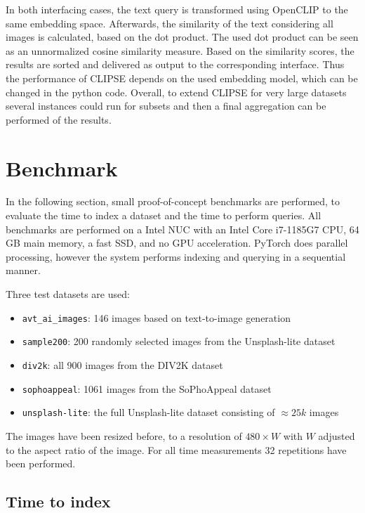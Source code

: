 \documentclass{article}
\begin{document}
In both interfacing cases, the text query is transformed using OpenCLIP to the same embedding space.
Afterwards, the similarity of the text considering all images is calculated, based on the dot product.
The used dot product can be seen as an unnormalized cosine similarity measure.
Based on the similarity scores, the results are sorted and delivered as output to the corresponding interface.
Thus the performance of CLIPSE depends on the used embedding model, which can be changed in the python code.
Overall, to extend CLIPSE for very large datasets several instances could run for subsets and then a final aggregation can be performed of the results.

\section{Benchmark}
In the following section, small proof-of-concept benchmarks are performed, to evaluate the time to index a dataset and the time to perform queries.
All benchmarks are performed on a Intel NUC with an Intel Core i7-1185G7 CPU, 64 GB main memory, a fast SSD, and no GPU acceleration.
PyTorch does parallel processing, however the system performs indexing and querying in a sequential manner.

Three test datasets are used:
\begin{itemize}
    \item \texttt{avt\_ai\_images}: 146 images based on text-to-image generation~\cite{goering2023ai,goering2023aiquality}
    \item \texttt{sample200}: 200 randomly selected images from the Unsplash-lite dataset~\cite{unsplash}
    \item \texttt{div2k}: all 900 images from the DIV2K dataset~\cite{agustsson2017ntire}
    \item \texttt{sophoappeal}: 1061 images from the SoPhoAppeal dataset~\cite{goering2023imageappeal}
    \item \texttt{unsplash-lite}: the full Unsplash-lite dataset consisting of $\approx 25k$ images
\end{itemize}

The images have been resized before, to a resolution of $480\times W$ with $W$ adjusted to the aspect ratio of the image.
For all time measurements 32 repetitions have been performed.

\subsection{Time to index}
\end{document}
